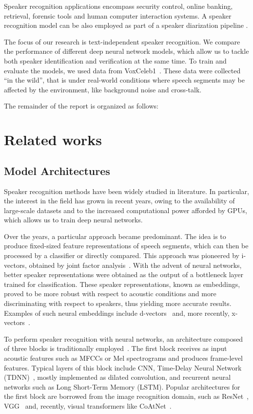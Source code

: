 \documentclass[conference]{IEEEtran}
\begin{document}
Speaker recognition applications encompass security control, online banking, retrieval, forensic tools and human computer interaction systems. A speaker recognition model can be also employed as part of a speaker diarization pipeline \cite{chung2018voxceleb2,park2022review}.

The focus of our research is text-independent speaker recognition. We compare the performance of different deep neural network models, which allow us to tackle both speaker identification and verification at the same time. To train and evaluate the models, we used data from VoxCeleb1~\cite{nagrani2020voxceleb}. These data were collected ``in the wild'', that is under real-world conditions where speech segments may be affected by the environment, like background noise and cross-talk.

The remainder of the report is organized as follows:


\section{Related works}

\subsection{Model Architectures}

Speaker recognition methods have been widely studied in literature. In particular, the interest in the field has grown in recent years, owing to the availability of large-scale datasets and to the increased computational power afforded by GPUs, which allows us to train deep neural networks.

Over the years, a particular approach became predominant. The idea is to produce fixed-sized feature representations of speech segments, which can then be processed by a classifier or directly compared. This approach was pioneered by i-vectors, obtained by joint factor analysis~\cite{dehak2011ivectors}. With the advent of neural networks, better speaker representations were obtained as the output of a bottleneck layer trained for classification. These speaker representations, known as embeddings, proved to be more robust with respect to acoustic conditions and more discriminating with respect to speakers, thus yielding more accurate results. Examples of such neural embeddings include d-vectors~\cite{variani2014dvectors} and, more recently, x-vectors~\cite{snyder2017deep,snyder2018xvectors}.

To perform speaker recognition with neural networks, an architecture composed of three blocks is traditionally employed~\cite{okabe2018asp}. The first block receives as input acoustic features such as MFCCs or Mel spectrograms and produces frame-level features. Typical layers of this block include CNN, Time-Delay Neural Network (TDNN)~\cite{peddinti2015timedelay,waibel1989timedelay}, mostly implemented as dilated convolution, and recurrent neural networks such as Long Short-Term Memory (LSTM). Popular architectures for the first block are borrowed from the image recognition domain, such as ResNet~\cite{he2016resnet}, VGG~\cite{simonyan2014vgg} and, recently, visual transformers like CoAtNet~\cite{dai2021coatnet}. 
\end{document}
